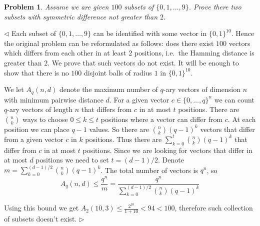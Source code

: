 \documentclass[12pt]{article}
\newtheorem{problem}{Problem}[subsection]
\newenvironment{solution}{\par $\triangleleft$}{$\triangleright$}
\begin{document}
\begin{problem} Assume we are given $100$ subsets of $\{0,1,\ldots,9\}$. Prove
there two subsets with symmetric difference not greater than $2$.
\end{problem}
\begin{solution} Each subset of $\{0,1,\dots, 9\}$ can be identified with some
    vector in ${\{0,1 \}}^{10}$. Hence the original problem can be reformulated
    as follows: does there exist $100$ vectors which differs from each other in
    at least $2$ positions, i.e.\ the Hamming distance is greater than $2$. We
    prove that such vectors do not exist. It will be enough to show that there
    is no $100$ disjoint balls of radius $1$ in ${\{0, 1 \}}^{10}$.


    We let $A_q(n,d)$ denote the maximum number of $q$-ary vectors of dimension
    $n$ with minimum pairwise distance $d$. For a given vector $c\in
        {\{0,\ldots,q \}}^n$ we can count $q$-ary vectors of length $n$ that differs
    from $c$ in at most $t$ positions. There are $\binom{n}{k}$ ways to choose
    $0\leq k\leq t$ positions where a vector can differ from $c$. At each
    position we can place $q-1$ values. So there are $\binom{n}{k}{(q-1)}^k$
    vectors that differ from a given vector $c$ in $k$ positions. Thus there are
    $\sum_{k=0}^ t\binom{n}{k}{(q-1)}^k$ that differ from $c$ in at most $t$
    positions. Since we are looking for vectors that differ in at most $d$
    positions we need to set $t=(d-1)/2$. Denote
    $m=\sum_{k=0}^{(d-1)/2}\binom{n}{k}{(q-1)}^k$. The total number of vectors
    is $q^n$, so
    $$
        A_q(n,d)\leq\frac{q^n}{m}
        =\frac{q^n}{\sum_{k=0}^{(d-1)/2}\binom{n}{k}{(q-1)}^k}
    $$

    Using this bound we get $A_2(10,3) \leq \frac{2^{10}}{1 + 10} < 94<100$,
    therefore such collection of subsets doesn't exist.
\end{solution}
\end{document}
